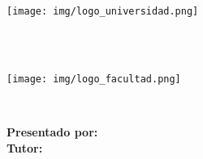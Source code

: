 \begin{titlepage}
    \begin{minipage}{2.16cm}
        \begin{center}
            \texttt{[image: img/logo\_universidad.png]}
        \end{center}
    \end{minipage}
    \hfill
    \begin{minipage}{10cm}
        \begin{center}
            \large{ \textbf{\MakeUppercase{\nombreUniversidad}} }\\
            \normalsize{ \textbf{\MakeUppercase{\nombreFacultad}} }\\
            \small{ \textbf{\MakeUppercase{\nombreCarrera}} }
        \end{center}
    \end{minipage}
    \hfill
    \begin{minipage}{2.55cm}
        \begin{center}
            \texttt{[image: img/logo\_facultad.png]}
        \end{center}
    \end{minipage}
    \vspace{5cm}\\

    \begin{center}
        \textbf{\Large\MakeUppercase{\nombreProyecto}}
    \end{center}

    \vspace{4cm}
    \begin{center}
        \Large\descripcion
    \end{center}

    \vspace{2cm}
    \Large\textnormal{\textbf{Presentado por:} \nombreAutor}\\
    \Large\textnormal{\textbf{Tutor:} \nombreTutor}\\

    \vspace{2.5cm}
    \begin{center}
        \large\textbf{\MakeUppercase{\nombreCiudadPais}}\\
        \fecha
    \end{center}
\end{titlepage}
\restoregeometry